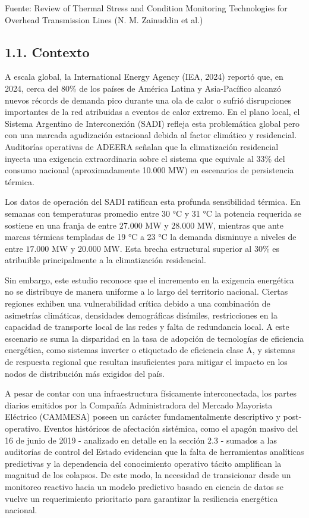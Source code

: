 Fuente: Review of Thermal Stress and Condition Monitoring Technologies for Overhead Transmission Lines (N. M. Zainuddin et al.)

\hypertarget{contexto}{%
\subsection{1.1. Contexto}\label{contexto}}

A escala global, la International Energy Agency (IEA, 2024) reportó que, en 2024, cerca del 80\% de los países de América Latina y Asia-Pacífico alcanzó nuevos récords de demanda pico durante una ola de calor o sufrió disrupciones importantes de la red atribuidas a eventos de calor extremo. En el plano local, el Sistema Argentino de Interconexión (SADI) refleja esta problemática global pero con una marcada agudización estacional debida al factor climático y residencial. Auditorías operativas de ADEERA señalan que la climatización residencial inyecta una exigencia extraordinaria sobre el sistema que equivale al 33\% del consumo nacional (aproximadamente 10.000 MW) en escenarios de persistencia térmica.

Los datos de operación del SADI ratifican esta profunda sensibilidad térmica. En semanas con temperaturas promedio entre 30 °C y 31 °C la potencia requerida se sostiene en una franja de entre \(27.000\text{~MW}\) y \(28.000\text{~MW}\), mientras que ante marcas térmicas templadas de 19 °C a 23 °C la demanda disminuye a niveles de entre \(17.000\text{~MW}\) y \(20.000\text{~MW}\). Esta brecha estructural superior al 30\% es atribuible principalmente a la climatización residencial.

Sin embargo, este estudio reconoce que el incremento en la exigencia energética no se distribuye de manera uniforme a lo largo del territorio nacional. Ciertas regiones exhiben una vulnerabilidad crítica debido a una combinación de asimetrías climáticas, densidades demográficas disímiles, restricciones en la capacidad de transporte local de las redes y falta de redundancia local. A este escenario se suma la disparidad en la tasa de adopción de tecnologías de eficiencia energética, como sistemas inverter o etiquetado de eficiencia clase A, y sistemas de respuesta regional que resultan insuficientes para mitigar el impacto en los nodos de distribución más exigidos del país.

A pesar de contar con una infraestructura físicamente interconectada, los partes diarios emitidos por la Compañía Administradora del Mercado Mayorista Eléctrico (CAMMESA) poseen un carácter fundamentalmente descriptivo y post-operativo. Eventos históricos de afectación sistémica, como el apagón masivo del 16 de junio de 2019 - analizado en detalle en la sección 2.3 - sumados a las auditorías de control del Estado evidencian que la falta de herramientas analíticas predictivas y la dependencia del conocimiento operativo tácito amplifican la magnitud de los colapsos. De este modo, la necesidad de transicionar desde un monitoreo reactivo hacia un modelo predictivo basado en ciencia de datos se vuelve un requerimiento prioritario para garantizar la resiliencia energética nacional.

